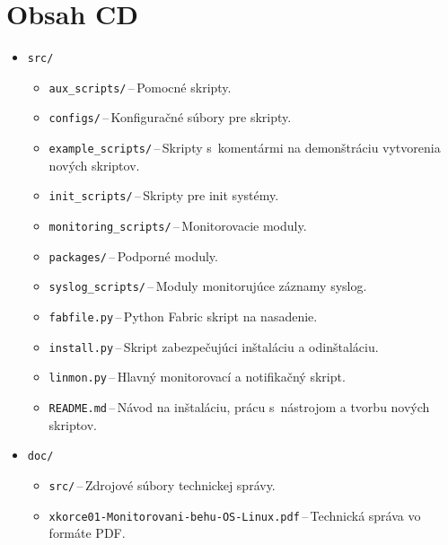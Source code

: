 \newpage

\chapter{Obsah CD}
\label{cd}
\begin{itemize}
	\item \texttt{src/}
	\begin{itemize}
		\item \texttt{aux\_scripts/}\,--\,Pomocné skripty.
		\item \texttt{configs/}\,--\,Konfiguračné súbory pre skripty.
		\item \texttt{example\_scripts/}\,--\,Skripty s~komentármi na demonštráciu vytvorenia nových skriptov.	
		\item \texttt{init\_scripts/}\,--\,Skripty pre init systémy.
		\item \texttt{monitoring\_scripts/}\,--\,Monitorovacie moduly.
		\item \texttt{packages/}\,--\,Podporné moduly.
		\item \texttt{syslog\_scripts/}\,--\,Moduly monitorujúce záznamy syslog.
		\item \texttt{fabfile.py}\,--\,Python Fabric skript na nasadenie.
		\item \texttt{install.py}\,--\,Skript zabezpečujúci inštaláciu a odinštaláciu.
		\item \texttt{linmon.py}\,--\,Hlavný monitorovací a notifikačný skript.
		\item \texttt{README.md}\,--\,Návod na inštaláciu, prácu s~nástrojom a tvorbu nových skriptov.
   \end{itemize}
	\item \texttt{doc/}
	\begin{itemize}
		\item \texttt{src/}\,--\,Zdrojové súbory technickej správy.
		\item \texttt{xkorce01-Monitorovani-behu-OS-Linux.pdf}\,--\,Technická správa vo formáte PDF.
	\end{itemize}
\end{itemize}